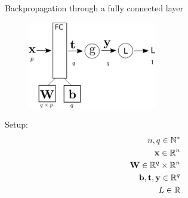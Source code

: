 \documentclass[xcolor=pdftex,dvipsnames,table,mathserif]{beamer}
\begin{document}




\begin{frame}{Backpropagation through a fully connected layer}
\begin{figure}
\includegraphics[width=0.5\textwidth]{../graphics/bp_fc.png}
\end{figure}

Setup:
\begin{eqnarray*}
n, q \in \mathbb{N}^*\\
\mathbf{x} \in \mathbb{R}^n \\
\mathbf{W} \in \mathbb{R}^q \times \mathbb{R}^n \\
\mathbf{b}, \mathbf{t}, \mathbf{y} \in \mathbb{R}^q \\
L \in \mathbb{R}
\end{eqnarray*}

\end{frame}
\end{document}
